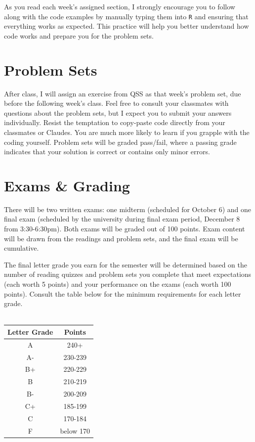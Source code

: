 \documentclass[11pt, letterpaper]{article}
\begin{document}
As you read each week's assigned section, I strongly encourage you to follow along with the code examples by manually typing them into \texttt{R} and ensuring that everything works as expected. This practice will help you better understand how code works and prepare you for the problem sets.

\section*{Problem Sets}

After class, I will assign an exercise from QSS as that week's problem set, due before the following week's class. Feel free to consult your classmates with questions about the problem sets, but I expect you to submit your answers individually. Resist the temptation to copy-paste code directly from your classmates or Claudes. You are much more likely to learn if you grapple with the coding yourself. Problem sets will be graded pass/fail, where a passing grade indicates that your solution is correct or contains only minor errors. 

\section*{Exams \& Grading}

There will be two written exams: one midterm (scheduled for October 6) and one final exam (scheduled by the university during final exam period, December 8 from 3:30-6:30pm). Both exams will be graded out of 100 points. Exam content will be drawn from the readings and problem sets, and the final exam will be cumulative. 

The final letter grade you earn for the semester will be determined based on the number of reading quizzes and problem sets you complete that meet expectations (each worth 5 points) and your performance on the exams (each worth 100 points). Consult the table below for the minimum requirements for each letter grade. \\\\
\begin{center}
\begin{tabular}{|c|c|}
	\hline
	Letter Grade & Points \\
	\hline
	A & 240+ \\
	\hline
	A- & 230-239 \\
	\hline
	B+ & 220-229 \\
	\hline
	B & 210-219 \\
	\hline
	B- & 200-209 \\
	\hline
	C+ & 185-199 \\
	\hline
	C & 170-184 \\
	\hline
	F & below 170 \\
	\hline
\end{tabular} 
\end{center}
\end{document}
